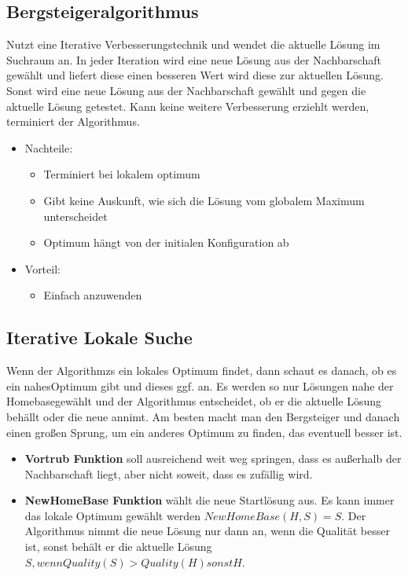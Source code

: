 \documentclass[jou,apacite]{apa6}
\begin{document}
\subsection{Bergsteigeralgorithmus}
Nutzt eine Iterative Verbesserungstechnik und wendet die aktuelle Lösung im Suchraum an. In jeder Iteration wird eine neue Lösung aus der Nachbarschaft gewählt und liefert diese einen besseren Wert wird diese zur aktuellen Lösung. Sonst wird eine neue Lösung aus der Nachbarschaft gewählt und gegen die aktuelle Lösung getestet. Kann keine weitere Verbesserung erziehlt werden, terminiert der Algorithmus. 

\begin{itemize}
    \item Nachteile:
    \begin{itemize}
        \item Terminiert bei lokalem optimum
        \item Gibt keine Auskunft, wie sich die Lösung vom globalem Maximum unterscheidet
        \item Optimum hängt von der initialen Konfiguration ab
    \end{itemize}
    \item Vorteil:
    \begin{itemize}
        \item Einfach anzuwenden
    \end{itemize}
\end{itemize}

\subsection{Iterative Lokale Suche}
Wenn der Algorithmzs ein lokales Optimum findet, dann schaut es danach, ob es ein \dq nahes\dq  Optimum gibt und dieses ggf. an. Es werden so nur Lösungen nahe der \dq Homebase\dq  gewählt und der Algorithmus entscheidet, ob er die aktuelle Lösung behällt oder die neue annimt. Am besten macht man den Bergsteiger und danach einen \dq großen Sprung\dq , um ein anderes Optimum zu finden, das eventuell besser ist. 

\begin{itemize}
    \item {\bfseries Vortrub Funktion} soll ausreichend weit weg springen, dass es außerhalb der Nachbarschaft liegt, aber nicht soweit, dass es zufällig wird.
    \item {\bfseries NewHomeBase Funktion} wählt die neue Startlösung aus. Es kann immer das lokale Optimum gewählt werden $NewHomeBase(H,S) = S$. Der Algorithmus nimmt die neue Lösung nur dann an, wenn die Qualität besser ist, sonst behält er die aktuelle Lösung $S, wenn Quality(S) > Quality(H) sonst H$.
\end{itemize}
\end{document}
